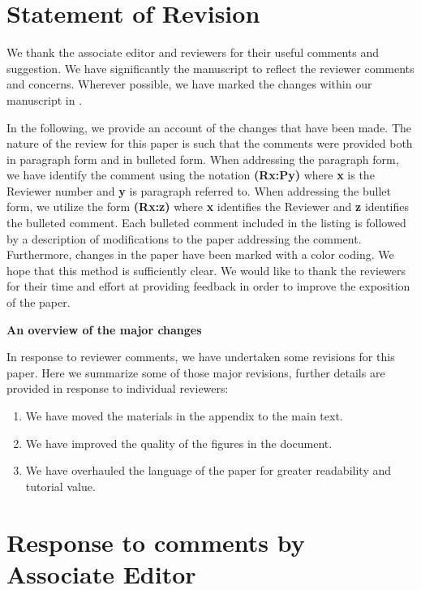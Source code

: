 \documentclass{letter}
\newcommand{\rr}[1]{{\bf \color{blue}{#1}}}
\begin{document}
\section{Statement of Revision}

We thank the associate editor and reviewers for their useful comments and suggestion. We have significantly the manuscript to reflect the reviewer comments and concerns. Wherever possible, we have marked the changes within our manuscript in \rr{blue}.

In the following, we provide an account of the changes that have been made.  The nature of the review for this paper is such that the comments were provided both in paragraph form and in bulleted form.  When addressing the paragraph form, we have identify the comment using the notation {\bf {\color{red}(Rx:Py)}} where {\bf x} is the Reviewer number and {\bf y} is paragraph referred to. When addressing the bullet form, we utilize the form {\bf (Rx:z)} where {\bf x} identifies the Reviewer and {\bf z} identifies the bulleted comment. Each bulleted comment included in the listing is followed by a description of modifications to the paper addressing the comment. Furthermore, changes in the paper have been marked with a color coding.  We hope that this method is sufficiently clear. We would like to thank the reviewers for their time and effort at providing feedback in order to improve the exposition of the paper.

\noindent\textbf{An overview of the major changes}

In response to reviewer comments, we have undertaken some revisions for this paper. Here we summarize some of those major revisions, further details are provided in response to individual reviewers:

\begin{enumerate}
\item We have moved the materials in the appendix to the main text.
\item We have improved the quality of the figures in the document.
\item We have overhauled the language of the paper for greater readability and tutorial value.

\end{enumerate}

\section{Response to comments by Associate Editor}
\end{document}
